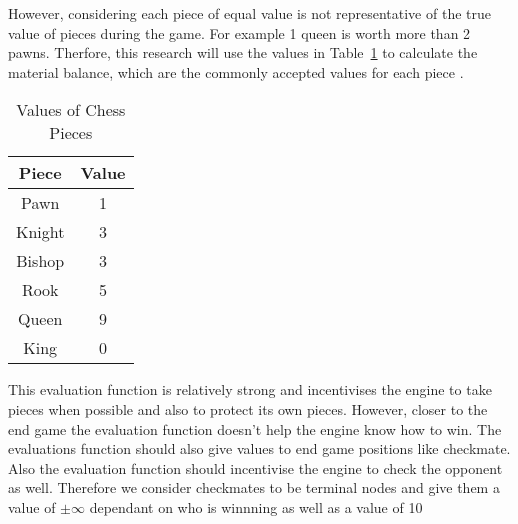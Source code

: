 However, considering each piece of equal value is not representative of the true value of pieces during the game. For example 1 queen is worth more than 2 pawns. Therfore, this research will use the values in Table~\ref{tab:values} to calculate the material balance, which are the commonly accepted values for each piece \cite{guptaDeterminingChessPiece2023}.

\begin{table}[h]
    \centering
    \begin{tabular}{|c|c|}
        \hline
        \textbf{Piece} & \textbf{Value} \\
        \hline
        Pawn & 1 \\
        Knight & 3 \\
        Bishop & 3 \\
        Rook & 5 \\
        Queen & 9 \\
        King & 0 \\
        \hline
    \end{tabular}
    \caption{Values of Chess Pieces}
    \label{tab:values}
\end{table}

This evaluation function is relatively strong and incentivises the engine to take pieces when possible and also to protect its own pieces. However, closer to the end game the evaluation function doesn't help the engine know how to win. The evaluations function should also give values to end game positions like checkmate. Also the evaluation function should incentivise the engine to check the opponent as well. Therefore we consider checkmates to be terminal nodes and give them a value of $\pm \infty$ dependant on who is winnning as well as a value of 10